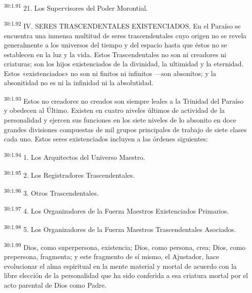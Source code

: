 \par
\textsuperscript{30:1.91} 21. Los Supervisores del Poder Morontial.

\par
\textsuperscript{30:1.92} IV. SERES TRASCENDENTALES EXISTENCIADOS. En el Paraíso se encuentra una inmensa multitud de seres trascendentales cuyo origen no se revela generalmente a los universos del tiempo y del espacio hasta que éstos no se establecen en la luz y la vida. Estos Trascendentales no son ni creadores ni criaturas; son los hijos existenciados de la divinidad, la ultimidad y la eternidad. Estos «existenciados» no son ni finitos ni infinitos ---son absonitos; y la absonitidad no es ni la infinidad ni la absolutidad.

\par
\textsuperscript{30:1.93} Estos no creadores no creados son siempre leales a la Trinidad del Paraíso y obedecen al Último. Existen en cuatro niveles últimos de actividad de la personalidad y ejercen sus funciones en los siete niveles de lo absonito en doce grandes divisiones compuestas de mil grupos principales de trabajo de siete clases cada uno. Estos seres existenciados incluyen a las órdenes siguientes:

\par
\textsuperscript{30:1.94} 1. Los Arquitectos del Universo Maestro.

\par
\textsuperscript{30:1.95} 2. Los Registradores Trascendentales.

\par
\textsuperscript{30:1.96} 3. Otros Trascendentales.

\par
\textsuperscript{30:1.97} 4. Los Organizadores de la Fuerza Maestros Existenciados Primarios.

\par
\textsuperscript{30:1.98} 5. Los Organizadores de la Fuerza Maestros Trascendentales Asociados.

\par
\textsuperscript{30:1.99} Dios, como superpersona, existencia; Dios, como persona, crea; Dios, como prepersona, fragmenta; y este fragmento de sí mismo, el Ajustador, hace evolucionar el alma espiritual en la mente material y mortal de acuerdo con la libre elección de la personalidad que ha sido conferida a esa criatura mortal por el acto parental de Dios como Padre.

